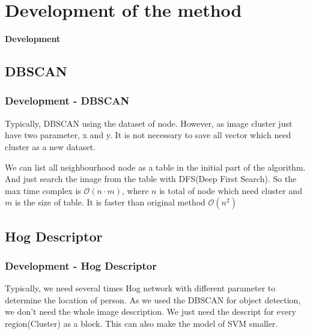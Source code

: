 \documentclass{beamer}
\begin{document}
\section{Development of the method}
\begin{frame}
\textbf{Development}
\end{frame}



\subsection{DBSCAN}
\begin{frame}
\frametitle{Development - DBSCAN}
Typically, DBSCAN using the dataset of node. However, as image cluster just have two parameter, x and y. It is not necessary to save all vector which need cluster as a new dataset.

We can list all neighbourhood node as a table in the initial part of the algorithm. And just search the image from the table with DFS(Deep First Search). So the max time complex is $\mathcal{O}{(n\cdot m)}$, where $n$ is total of node which need cluster and $m$ is the size of table. It is faster than original method $\mathcal{O}{(n^2)}$
\end{frame}



\subsection{Hog Descriptor}
\begin{frame}
\frametitle{Development - Hog Descriptor}
Typically, we need several times Hog network with different parameter to determine the location of person.\cite{Lipetski2017} As we used the DBSCAN for object detection, we don't need the whole image description. We just need the descript for every region(Cluster) as a block. This can also make the model of SVM smaller.

\end{frame}
\end{document}
